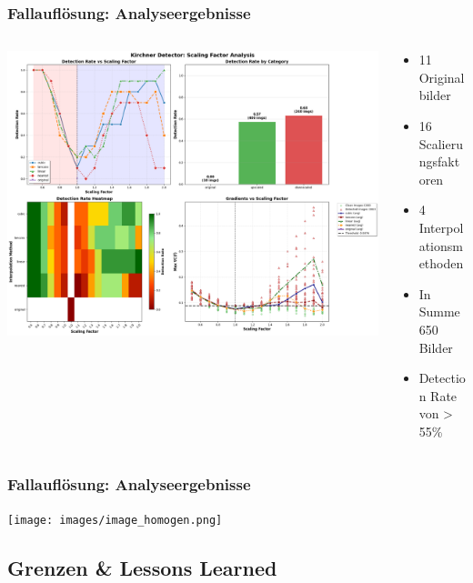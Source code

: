 \documentclass[11pt,t,usepdftitle=false,aspectratio=169]{beamer}
\begin{document}
\begin{frame}
	\frametitle{Fallauflösung: Analyseergebnisse}
	\begin{columns}[T]
		\begin{column}{0.6\textwidth}
			\includegraphics[width=\textwidth]{images/scaling_analysis_report_full.png}
		\end{column}
		\begin{column}{0.40\textwidth}
			\begin{itemize}
				\item 11 Originalbilder
				\item 16 Scalierungsfaktoren
				\item 4 Interpolationsmethoden
				\item In Summe 650 Bilder
				\item Detection Rate von > 55\%
			\end{itemize}
		\end{column}
	\end{columns}
\end{frame}

\begin{frame}
	\frametitle{Fallauflösung: Analyseergebnisse}
	\center \texttt{[image: images/image\_homogen.png]}
\end{frame}

\subsection{Grenzen \& Lessons Learned}
\end{document}
